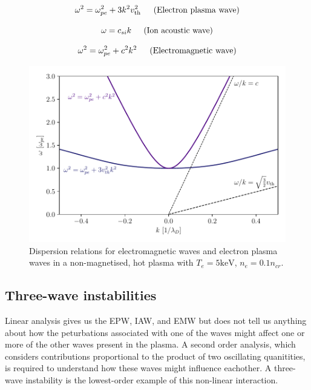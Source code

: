 \begin{equation}\label{eqn:bohm-gross}
	\omega^{2}=\omega_{p e}^{2}+3 k^{2} v_{\text{th}}^{2} \text{\,\,\,\,\,\,\,\,\,(Electron plasma wave)}
\end{equation}

\begin{equation}
 \omega =  c_{si} k \text{\,\,\,\,\,\,\,\,\,(Ion acoustic wave)}
\end{equation}

\begin{equation}
 \omega^{2}=\omega_{p e}^{2}+c^2k^{2} \text{\,\,\,\,\,\,\,\,\,(Electromagnetic wave)}
\end{equation}

\begin{figure}[ht]
   \centering
    \includegraphics[width=0.9\columnwidth]{Chapters/C2_Theory/EPW_EMW_dispersion.pdf}
    \caption{Dispersion relations for electromagnetic waves and electron plasma waves in a non-magnetised, hot plasma with $T_e= 5\text{keV}$, $n_e=0.1n_{cr}$.}
    \label{fig:EMW_EPW_disp}
\end{figure}{}


\subsection{Three-wave instabilities}
Linear analysis gives us the EPW, IAW, and EMW but does not tell us anything about how the peturbations associated with one of the waves might affect one or more of the other waves present in the plasma. A second order analysis, which considers contributions proportional to the product of two oscillating quanitities, is required to understand how these waves might influence eachother. A three-wave instability is the lowest-order example of this non-linear interaction.

